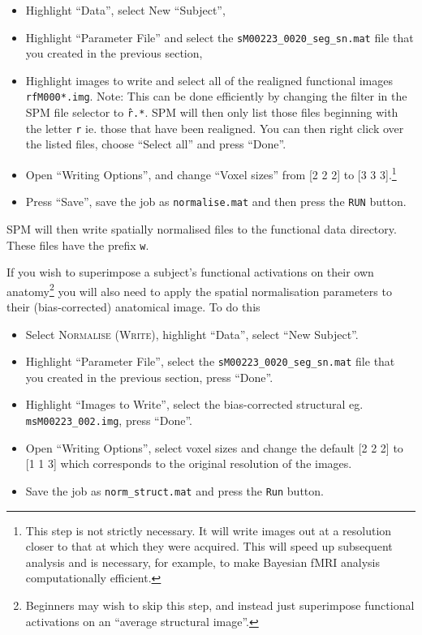 \begin{itemize}
\item Highlight ``Data'', select New ``Subject'',
\item Highlight ``Parameter File'' and select the \texttt{sM00223\_0020\_seg\_sn.mat} file that you created in the previous section,
\item Highlight images to write and select all of the realigned functional images \texttt{rfM000*.img}. Note: This can be done efficiently by changing the filter in the SPM file selector to \texttt{\^r.*}. SPM will then only list those files beginning with the letter \texttt{r} ie. those that have been realigned. You can then right click over the listed files, choose ``Select all'' and press ``Done''.
\item Open ``Writing Options'', and change ``Voxel sizes'' from [2 2 2] to [3 3 3].\footnote{This step is not strictly necessary. It will write images out at a resolution closer to that at which they were acquired. This will speed up subsequent analysis and is necessary, for example, to make Bayesian fMRI analysis computationally efficient.}
\item Press ``Save'', save the job as \texttt{normalise.mat} and then press the \texttt{RUN} button.
\end{itemize}

SPM will then write spatially normalised files to the functional data directory. These files have the prefix \texttt{w}.

If you wish to superimpose a subject's functional activations on their own anatomy\footnote{Beginners may wish to skip this step, and instead just superimpose functional activations on an ``average structural image''.} you will also need to apply the spatial normalisation parameters to their (bias-corrected) anatomical image. To do this

\begin{itemize}
\item Select \textsc{Normalise (Write)}, highlight ``Data'', select ``New Subject''.
\item Highlight ``Parameter File'', select the  \texttt{sM00223\_0020\_seg\_sn.mat} file that you created in the previous section, press ``Done''.
\item Highlight ``Images to Write'', select the bias-corrected structural eg. \texttt{msM00223\_002.img}, press ``Done''.
\item Open ``Writing Options'', select voxel sizes and change the default [2 2 2] to [1 1 3] which corresponds to the original resolution of the images.
\item Save the job as \texttt{norm\_struct.mat} and press the \texttt{Run} button.
\end{itemize}

